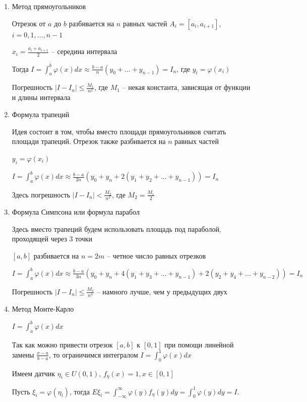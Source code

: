\documentclass[12pt]{article}
\begin{document}
\begin{enumerate}[label*=\Roman*. ]
    \item Метод прямоугольников

    Отрезок от $a$ до $b$ разбивается на $n$ равных частей $A_i = [a_i, a_{i + 1}]$, $i = 0, 1, \dots, n - 1$

    $x_i = \frac{a_i + a_{i + 1}}{2}$ -- середина интервала

    Тогда $I = \int_a^b \varphi(x) dx \approx \frac{b - a}{n} (y_0 + \dots + y_{n - 1}) = I_n$, где $y_i = \varphi(x_i)$

    Погрешность $|I - I_n| \leq \frac{M_1}{n^2}$, где $M_1$ -- некая константа, зависящая от функции и длины интервала

    \item Формула трапеций

    Идея состоит в том, чтобы вместо площади прямоугольников считать площади трапеций. Отрезок также разбивается на $n$ равных частей

    $y_i = \varphi(x_i)$

    $I = \int_a^b \varphi(x) dx \approx \frac{b - a}{2n} (y_0 + y_n + 2(y_1 + y_2 + \dots + y_{n - 1})) = I_n$

    Здесь погрешность $|I - I_n| < \frac{M_2}{n^2}$, где $M_2 = \frac{M_1}{2}$

    \item Формула Симпсона или формула парабол

    Здесь вместо трапеций будем использовать площадь под параболой, проходящей через 3 точки

    $[a, b]$ разбивается на $n = 2m$ -- четное число равных отрезков

    $I = \int_a^b \varphi(x) dx \approx \frac{b - a}{3n} (y_0 + y_n + 4(y_1 + y_3 + \dots + y_{n - 1}) + 2(y_2 + y_4 + \dots + y_{n - 2})) = I_n$

    Погрешность $|I - I_n| \leq \frac{M_3}{n^4}$ -- намного лучше, чем у предыдущих двух

    \item Метод Монте-Карло

    $I = \int_a^b \varphi(x) dx$

    Так как можно привести отрезок $[a, b]$ к $[0, 1]$ при помощи линейной замены $\frac{x - a}{b - a}$, то ограничимся интегралом $I = \int_0^1 \varphi(x) dx$

    Имеем датчик $\eta_i \in U(0, 1)$, $f_{\eta} (x) = 1, x \in [0, 1]$

    Пусть $\xi_i = \varphi(\eta_i)$, тогда $E\xi_i = \int_{-\infty}^{\infty} \varphi(y) f_\eta (y) dy = \int_0^1 \varphi(y) dy = I$. 
    

\end{enumerate}
\end{document}

